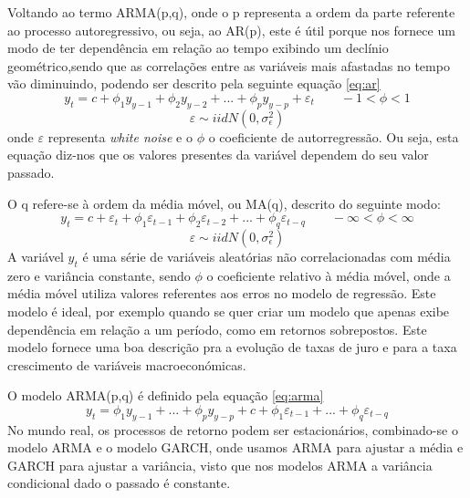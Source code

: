\documentclass[
  12pt,
  a4paper,
  openany]{book}
\begin{document}
Voltando ao termo ARMA(p,q), onde o p representa a ordem da parte referente ao processo autoregressivo, ou seja, ao AR(p), este é útil porque nos fornece um modo de ter dependência em relação ao tempo exibindo um declínio geométrico,sendo que as correlações entre as variáveis mais afastadas no tempo vão diminuindo, podendo ser descrito pela seguinte equação \eqref{eq:ar}
\begin{equation} 
  y_t =c+\phi_1y_{y-1}+\phi_2y_{y-2}+...+\phi_py_{y-p}+\varepsilon_t\qquad   -1<\phi<1
  \label{eq:ar}
\end{equation}
\begin{equation} 
  \nonumber \varepsilon \sim iid N(0,\sigma_{\epsilon}^{2})
\end{equation}
onde \(\varepsilon\) representa \emph{white noise} e o \(\phi\) o coeficiente de autorregressão. Ou seja, esta equação diz-nos que os valores presentes da variável dependem do seu valor passado.

O q refere-se à ordem da média móvel, ou MA(q), descrito do seguinte modo:
\begin{equation} 
  y_t =c+\varepsilon_t+\phi_1\varepsilon_{t-1}+\phi_2\varepsilon_{t-2}+...+\phi_q\varepsilon_{t-q}\qquad   -\infty<\phi<\infty 
  \label{eq:ma}
\end{equation}
\begin{equation} 
  \nonumber \varepsilon \sim iid N(0,\sigma_{\epsilon}^{2})
\end{equation}
A variável \(y_t\) é uma série de variáveis aleatórias não correlacionadas com média zero e variância constante, sendo \(\phi\) o coeficiente relativo à média móvel, onde a média móvel utiliza valores referentes aos erros no modelo de regressão. Este modelo é ideal, por exemplo quando se quer criar um modelo que apenas exibe dependência em relação a um período, como em retornos sobrepostos. Este modelo fornece uma boa descrição pra a evolução de taxas de juro e para a taxa crescimento de variáveis macroeconómicas.

O modelo ARMA(p,q) é definido pela equação \eqref{eq:arma}
\begin{equation} 
  y_t =\phi_1y_{y-1}+...+\phi_py_{y-p}+c+\phi_1\varepsilon_{t-1}+...+\phi_q\varepsilon_{t-q}
  \label{eq:arma}
\end{equation}
No mundo real, os processos de retorno podem ser estacionários, combinado-se o modelo ARMA e o modelo GARCH, onde usamos ARMA para ajustar a média e GARCH para ajustar a variância, visto que nos modelos ARMA a variância condicional dado o passado é constante.
\end{document}
